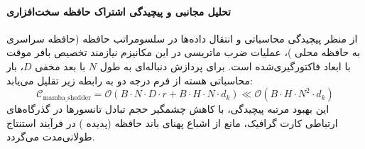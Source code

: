 \paragraph{تحلیل مجانبی و پیچیدگی اشتراک حافظه سخت‌افزاری}
از منظر پیچیدگی محاسباتی و انتقال داده‌ها در سلسومراتب حافظه (حافظه سراسری  به حافظه محلی )، عملیات ضرب ماتریسی در این مکانیزم نیازمند تخصیص بافر موقت با ابعاد فاکتورگیری‌شده است. برای پردازش دنباله‌ای به طول $N$ با بعد مخفی $D$، بار محاسباتی هسته از فرم درجه دو به رابطه زیر تقلیل می‌یابد:
\begin{equation}
\label{eq:complexity_mamba_shedder}
\mathcal{C}_{\text{mamba\_shedder}} = \mathcal{O}\left( B \cdot N \cdot D \cdot r + B \cdot H \cdot N \cdot d_k \right) \ll \mathcal{O}\left( B \cdot H \cdot N^2 \cdot d_k \right)
\end{equation}
این بهبود مرتبه پیچیدگی، با کاهش چشمگیر حجم تبادل تانسورها در گذرگاه‌های ارتباطی کارت گرافیک، مانع از اشباع پهنای باند حافظه (پدیده ) در فرآیند استنتاج طولانی‌مدت می‌گردد.
